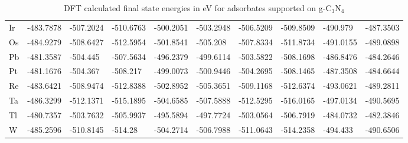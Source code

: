 \begin{table}[h]
{\begin{tabular}{*{10}{l}}
    Ir & -483.7878 & -507.2024 & -510.6763 & -500.2051 & -503.2948 & -506.5209 & -509.8509 & -490.979  & -487.3503 \\
    Os & -484.9279 & -508.6427 & -512.5954 & -501.8541 & -505.208  & -507.8334 & -511.8734 & -491.0155 & -489.0898 \\
    Pb & -481.3587 & -504.445  & -507.5634 & -496.2379 & -499.6114 & -503.5822 & -508.1698 & -486.8476 & -484.2646 \\
    Pt & -481.1676 & -504.367  & -508.217  & -499.0073 & -500.9446 & -504.2695 & -508.1465 & -487.3508 & -484.6644 \\
    Re & -483.6421 & -508.9474 & -512.8388 & -502.8952 & -505.3651 & -509.1168 & -512.6374 & -493.0621 & -489.2811 \\
    Ta & -486.3299 & -512.1371 & -515.1895 & -504.6585 & -507.5888 & -512.5295 & -516.0165 & -497.0134 & -490.5695 \\
    Tl & -480.7357 & -503.7632 & -505.9937 & -495.5894 & -497.7724 & -503.0564 & -506.7919 & -484.0732 & -482.3846 \\
    W  & -485.2596 & -510.8145 & -514.28   & -504.2714 & -506.7988 & -511.0643 & -514.2358 & -494.433  & -490.6506 \\
    \hline
  \end{tabular}
  }
  \caption{DFT calculated final state energies in eV for adsorbates supported on g-C$_3$N$_4$}
  \label{si_table4}
\end{table}


